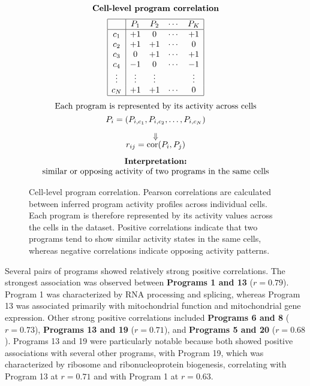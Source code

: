 \documentclass[11pt,a4paper]{article}
\begin{document}
\begin{figure}[h]
	\centering
	\setlength{\abovecaptionskip}{2pt}
	\[
	\begin{array}{c}
	\textbf{Cell-level program correlation}\\[6pt]
	\underset{\text{}}{
		\begin{array}{|c|cccc|}
		\hline
		& P_1 & P_2 & \cdots & P_K\\
		\hline
		c_1 & +1 & 0  & \cdots & +1\\
		c_2 & +1 & +1 & \cdots & 0\\
		c_3 & 0  & +1 & \cdots & +1\\
		c_4 & -1 & 0  & \cdots & -1\\
		\vdots & \vdots & \vdots & & \vdots\\
		c_N & +1 & +1 & \cdots & 0\\
		\hline
		\end{array}}
	\\[8pt]
	\text{Each program is represented by its activity across cells}\\[4pt]
	P_i=(P_{i,c_1},P_{i,c_2},\ldots,P_{i,c_N})\\[8pt]
	\Downarrow\\[-2pt]
	r_{ij}=\operatorname{cor}(P_i,P_j)\\[8pt]
	\textbf{Interpretation:}\\
	\text{similar or opposing activity of two programs in the same cells}
	\end{array}
	\]
	\caption{Cell-level program correlation. Pearson correlations are calculated between inferred program activity profiles across individual cells. Each program is therefore represented by its activity values across the cells in the dataset. Positive correlations indicate that two programs tend to show similar activity states in the same cells, whereas negative correlations indicate opposing activity patterns.}
	\label{fig:cell_level_program_correlation}
\end{figure} 

Several pairs of programs showed relatively strong positive correlations. The strongest association was observed between \textbf{Programs 1 and 13} ($r = 0.79$). Program 1 was characterized by RNA processing and splicing, whereas Program 13 was associated primarily with mitochondrial function and mitochondrial gene expression. Other strong positive correlations included \textbf{Programs 6 and 8} ($r = 0.73$), \textbf{Programs 13 and 19} ($r = 0.71$), and \textbf{Programs 5 and 20} ($r = 0.68$). Programs 13 and 19 were particularly notable because both showed positive associations with several other programs, with Program 19, which was characterized by ribosome and ribonucleoprotein biogenesis, correlating with Program 13 at $r = 0.71$ and with Program 1 at $r = 0.63$.
\end{document}
